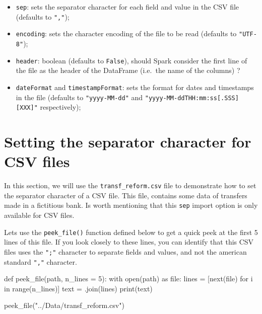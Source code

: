 \documentclass[
  11pt,
  letterpaper,
  DIV=11,
  numbers=noendperiod]{scrreprt}
\newenvironment{Shaded}{\begin{snugshade}}{\end{snugshade}}
\newcommand{\BuiltInTok}[1]{\textcolor[rgb]{0.00,0.23,0.31}{#1}}
\newcommand{\ControlFlowTok}[1]{\textcolor[rgb]{0.00,0.23,0.31}{#1}}
\newcommand{\DecValTok}[1]{\textcolor[rgb]{0.68,0.00,0.00}{#1}}
\newcommand{\ImportTok}[1]{\textcolor[rgb]{0.00,0.46,0.62}{#1}}
\newcommand{\KeywordTok}[1]{\textcolor[rgb]{0.00,0.23,0.31}{#1}}
\newcommand{\NormalTok}[1]{\textcolor[rgb]{0.00,0.23,0.31}{#1}}
\newcommand{\OperatorTok}[1]{\textcolor[rgb]{0.37,0.37,0.37}{#1}}
\newcommand{\StringTok}[1]{\textcolor[rgb]{0.13,0.47,0.30}{#1}}
\providecommand{\tightlist}{%
  \setlength{\itemsep}{0pt}\setlength{\parskip}{0pt}}\usepackage{longtable,booktabs,array}
\begin{document}
\begin{itemize}
\tightlist
\item
  \texttt{sep}: sets the separator character for each field and value in
  the CSV file (defaults to \texttt{","});
\item
  \texttt{encoding}: sets the character encoding of the file to be read
  (defaults to \texttt{"UTF-8"});
\item
  \texttt{header}: boolean (defaults to \texttt{False}), should Spark
  consider the first line of the file as the header of the DataFrame
  (i.e.~the name of the columns) ?
\item
  \texttt{dateFormat} and \texttt{timestampFormat}: sets the format for
  dates and timestamps in the file (defaults to \texttt{"yyyy-MM-dd"}
  and
  \texttt{"yyyy-MM-dd\textquotesingle{}T\textquotesingle{}HH:mm:ss{[}.SSS{]}{[}XXX{]}"}
  respectively);
\end{itemize}

\hypertarget{setting-the-separator-character-for-csv-files}{%
\section{Setting the separator character for CSV
files}\label{setting-the-separator-character-for-csv-files}}

In this section, we will use the \texttt{transf\_reform.csv} file to
demonstrate how to set the separator character of a CSV file. This file,
contains some data of transfers made in a fictitious bank. Is worth
mentioning that this \texttt{sep} import option is only available for
CSV files.

Lets use the \texttt{peek\_file()} function defined below to get a quick
peek at the first 5 lines of this file. If you look closely to these
lines, you can identify that this CSV files uses the \texttt{";"}
character to separate fields and values, and not the american standard
\texttt{","} character.

\begin{Shaded}
\begin{Highlighting}[]
\KeywordTok{def}\NormalTok{ peek\_file(path, n\_lines }\OperatorTok{=} \DecValTok{5}\NormalTok{):}
  \ControlFlowTok{with} \BuiltInTok{open}\NormalTok{(path) }\ImportTok{as} \BuiltInTok{file}\NormalTok{:}
\NormalTok{    lines }\OperatorTok{=}\NormalTok{ [}\BuiltInTok{next}\NormalTok{(}\BuiltInTok{file}\NormalTok{) }\ControlFlowTok{for}\NormalTok{ i }\KeywordTok{in} \BuiltInTok{range}\NormalTok{(n\_lines)]}
\NormalTok{  text }\OperatorTok{=} \StringTok{\textquotesingle{}\textquotesingle{}}\NormalTok{.join(lines)}
  \BuiltInTok{print}\NormalTok{(text)}
  
\NormalTok{peek\_file(}\StringTok{"../Data/transf\_reform.csv"}\NormalTok{)}
\end{Highlighting}
\end{Shaded}
\end{document}
